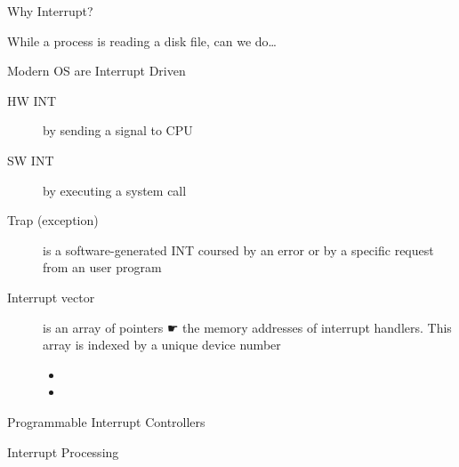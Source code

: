 \begin{frame}{Why Interrupt?}
  \begin{iblock}{While a process is reading a disk file, can we do\ldots}
    \begin{center}
    \end{center}
  \end{iblock}
\end{frame}

\begin{frame}{Modern OS are Interrupt Driven}
  \begin{description}
  \item[HW INT] by sending a signal to CPU
  \item[SW INT] by executing a \alert{system call}
  \item[Trap (exception)] is a software-generated INT coursed by an error or by a
    specific request from an user program
  \item[Interrupt vector] is an array of pointers ☛ the memory addresses
    of \alert{interrupt handlers}. This array is indexed by a unique device number
    \begin{itemize}
    \item[] 
    \item[] 
    \end{itemize}
  \end{description}
\end{frame}

\begin{frame}{Programmable Interrupt Controllers}
  \begin{center}
  \end{center}
\end{frame}

\begin{frame}{Interrupt Processing}
  \begin{center}
  \end{center}
\end{frame}

